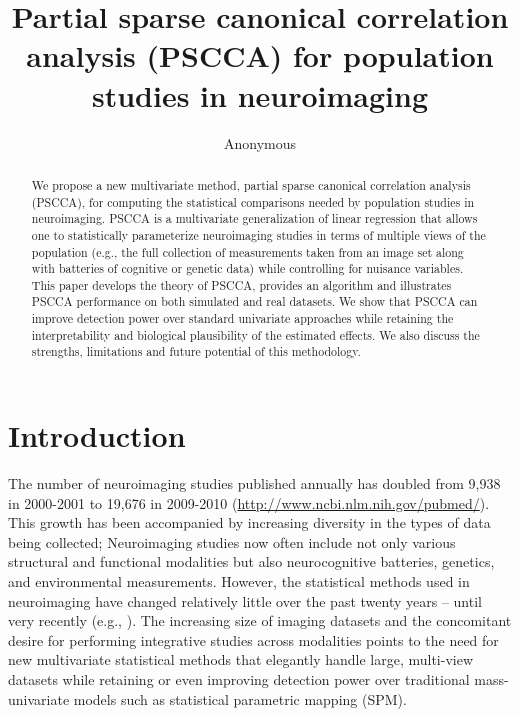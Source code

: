 \documentclass{llncs}
\begin{document}
\vspace{-0.1in}
\title{Partial sparse canonical correlation analysis (PSCCA) for population
  studies in neuroimaging}
\author{Anonymous}
\maketitle              
\begin{abstract}
We propose a new multivariate method, partial sparse canonical
correlation analysis (PSCCA), for computing the statistical
comparisons needed by population studies in neuroimaging.  PSCCA is a
multivariate generalization of linear regression that allows one to statistically parameterize neuroimaging studies in terms of
multiple views of the population (e.g., the full collection of
measurements taken from an image set along with batteries of cognitive
or genetic data) while controlling for nuisance variables.  This paper
develops the theory of PSCCA, provides an algorithm and illustrates
PSCCA performance on both simulated and real datasets.  We show that
PSCCA can improve detection power over standard univariate approaches
while retaining the interpretability and biological plausibility of
the estimated effects.  We also discuss the strengths, limitations and
future potential of this methodology.
\end{abstract}
\section{Introduction}
The number of neuroimaging studies published annually has doubled from
9,938 in 2000-2001 to 19,676 in 2009-2010
(\url{http://www.ncbi.nlm.nih.gov/pubmed/}).  This growth has been
accompanied by increasing diversity in the types of data being
collected;  Neuroimaging studies now often include not only various
structural and functional modalities but also neurocognitive
batteries, genetics, and environmental measurements.  However,
the statistical methods used in neuroimaging have changed relatively
little over the past twenty years -- until very recently
(e.g., \cite{Tosun2010a}).  The increasing size of imaging
datasets and the concomitant desire for performing integrative studies
across modalities points to the need for new multivariate statistical
methods that elegantly handle large, multi-view datasets while
retaining or even improving detection power over traditional
mass-univariate models such as statistical parametric mapping (SPM).
\end{document}
